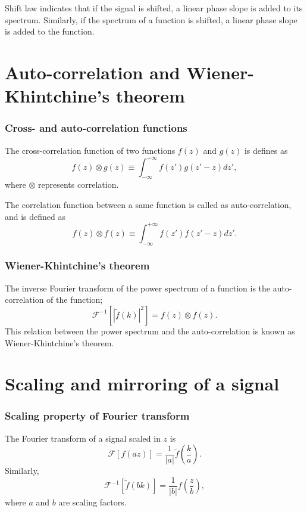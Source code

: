 \documentclass{article}[10pt,a4paper]
\newcommand{\ft}[1]{\mathcal{F}\left[{#1}\right]\xspace}
\newcommand{\ift}[1]{\mathcal{F}^{-1}\left[{#1}\right]\xspace}
\newcommand{\intinfty}{\int^{+\infty}_{-\infty}\xspace}
\newcommand{\abs}[1]{\left|{#1}\right|\xspace}
\begin{document}
Shift law indicates that if the signal is shifted, a linear phase slope is
added to its spectrum.
Similarly, if the spectrum of a function is shifted, a linear phase
slope is added to the function.

\section{Auto-correlation and Wiener-Khintchine's theorem}
\subsubsection*{Cross- and auto-correlation functions}
The cross-correlation function of two functions $f(z)$ and $g(z)$ is
defines as
\begin{equation}
 f(z) \otimes g(z) \equiv \intinfty f(z')g(z'-z) dz',
\end{equation}
where $\otimes$ represents correlation.

The correlation function between a same function is called as
auto-correlation, and is defined as
\begin{equation}
 f(z) \otimes f(z) \equiv \intinfty f(z')f(z'-z) dz'.
\end{equation}

\subsubsection*{Wiener-Khintchine's theorem}
The inverse Fourier transform of the power spectrum of a function is the
auto-correlation of the function;
\begin{equation}
 \ift{ \abs{\tilde{f}(k)}^2} = f(z) \otimes f(z).
\end{equation}
This relation between the power spectrum and the auto-correlation is
known as Wiener-Khintchine's theorem.

\section{Scaling and mirroring of a signal}
\subsubsection*{Scaling property of Fourier transform}
The Fourier transform of a signal scaled in $z$ is
\begin{equation}
 \ft{f(az)} = \frac{1}{\abs{a}} \tilde{f}\left(\frac{k}{a}\right).
\end{equation}
Similarly,
\begin{equation}
 \ift{\tilde{f}(bk)} = \frac{1}{\abs{b}}f\left(\frac{z}{b}\right),
\end{equation}
where $a$ and $b$ are scaling factors.
\end{document}

